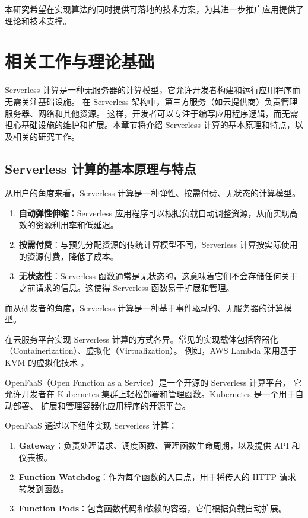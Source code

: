 \documentclass[a4paper,AutoFakeBold,oneside,12pt]{book}
\begin{document}
本研究希望在实现算法的同时提供可落地的技术方案，为其进一步推广应用提供了理论和技术支撑。

\chapter{相关工作与理论基础}

Serverless 计算是一种无服务器的计算模型，它允许开发者构建和运行应用程序而无需关注基础设施。
在 Serverless 架构中，第三方服务（如云提供商）负责管理服务器、网络和其他资源。
这样，开发者可以专注于编写应用程序逻辑，而无需担心基础设施的维护和扩展。本章节将介绍
Serverless 计算的基本原理和特点，以及相关的研究工作。

\section{Serverless 计算的基本原理与特点}

从用户的角度来看，Serverless 计算是一种弹性、按需付费、无状态的计算模型。

\begin{enumerate}
	\item\textbf{自动弹性伸缩}：Serverless 应用程序可以根据负载自动调整资源，从而实现高效的资源利用率和低延迟。
	\item\textbf{按需付费}：与预先分配资源的传统计算模型不同，Serverless 计算按实际使用的资源付费，降低了成本。
	\item\textbf{无状态性}：Serverless 函数通常是无状态的，这意味着它们不会存储任何关于之前请求的信息。这使得 Serverless 函数易于扩展和管理。
\end{enumerate}

而从研发者的角度，Serverless 计算是一种基于事件驱动的、无服务器的计算模型。

在云服务平台实现 Serverless
计算的方式各异。常见的实现载体包括容器化（Containerization）、虚拟化（Virtualization）。
例如，AWS Lambda 采用基于 KVM 的虚拟化技术 \cite{jumpertz2020how}。

OpenFaaS（Open Function as a Service）是一个开源的 Serverless 
计算平台，
它允许开发者在 Kubernetes 集群上轻松部署和管理函数。Kubernetes 是一个用于自动部署、
扩展和管理容器化应用程序的开源平台。

OpenFaaS 通过以下组件实现 Serverless 计算\cite{openfaas_design_2023}：

\begin{enumerate}
	\item\textbf{Gateway}：负责处理请求、调度函数、管理函数生命周期，以及提供 API 和仪表板。
	\item\textbf{Function Watchdog}：作为每个函数的入口点，用于将传入的 HTTP 请求转发到函数。
	\item\textbf{Function Pods}：包含函数代码和依赖的容器，它们根据负载自动扩展。
\end{enumerate}
\end{document}
